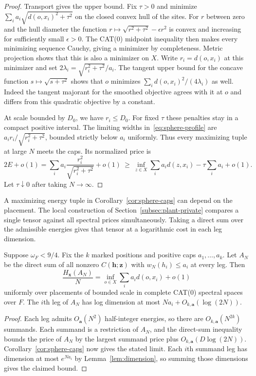 \begin{proof}
Transport gives the upper bound. Fix \(\tau>0\) and minimize
\(\sum_i a_i\sqrt{d(o,x_i)^2+\tau^2}\) on the closed convex hull of
the sites. For \(r\) between zero and the hull diameter the function \(r\mapsto\sqrt{r^2+\tau^2}-\epsilon r^2\) is
convex and increasing for sufficiently small \(\epsilon>0\). The CAT(0)
midpoint inequality then makes every minimizing sequence Cauchy, giving
a minimizer by completeness.
Metric projection shows that this is also a minimizer on \(X\).
Write \(r_i=d(o,x_i)\) at this minimizer and set
\(2\lambda_i=\sqrt{r_i^2+\tau^2}/a_i\). The tangent upper bound for the
concave function \(s\mapsto\sqrt{s+\tau^2}\) shows that \(o\) minimizes
\(\sum_i d(o,x_i)^2/(4\lambda_i)\) as well. Indeed the tangent
majorant for the smoothed objective agrees with it at \(o\) and differs
from this quadratic objective by a constant.

At scale bounded by \(D_0\), we have \(r_i\le D_0\). For fixed \(\tau\)
these penalties stay in a compact positive interval. The limiting
widths in~\eqref{eq:sphere-profile} are
\(a_i r_i/\sqrt{r_i^2+\tau^2}\), bounded strictly below \(a_i\) uniformly.
Thus every maximizing tuple at large \(N\) meets the caps. Its normalized
price is
\[
 2E+o(1)
 =\sum_i a_i\frac{r_i^2}{\sqrt{r_i^2+\tau^2}}+o(1)
 \ \ge\ \inf_{z\in X}\sum_i a_i d(z,x_i)-\tau\sum_i a_i+o(1).
\]
Let \(\tau\downarrow0\) after taking \(N\to\infty\).
\end{proof}

A maximizing energy tuple in Corollary~\ref{cor:sphere-caps} can depend
on the placement. The local construction of Section~\ref{subsec:plant-private}
compares a single tensor against all spectral prices simultaneously.
Taking a direct sum over the admissible energies gives that tensor at
a logarithmic cost in each leg dimension.

\begin{corollary}\label{cor:universal}
Suppose \(\omega_F<9/4\). Fix the \(k\) marked positions and positive
caps \(a_1,\ldots,a_k\). Let \(A_N\) be the direct sum of all nonzero
\(C(\mathbf h;\mathbf z)\) with \(w_N(h_i)\le a_i\) at every leg.
Then
\[
 \frac{H_{\mathbf x}(A_N)}{N}=\inf_{o\in X}\sum_i a_i d(o,x_i)+o(1)
\]
uniformly over placements of bounded scale in complete CAT(0)
spectral spaces over \(F\). The \(i\)th leg of \(A_N\) has log dimension
at most \(Na_i+O_{k,\mathbf a}(\log(2N))\).
\end{corollary}

\begin{proof}
Each leg admits \(O_{\mathbf a}(N^2)\) half-integer energies, so
there are \(O_{k,\mathbf a}(N^{2k})\) summands. Each summand is a
restriction of \(A_N\), and the direct-sum inequality bounds the price
of \(A_N\) by the largest summand price plus
\(O_{k,\mathbf a}(D\log(2N))\). Corollary~\ref{cor:sphere-caps} now
gives the stated limit. Each \(i\)th summand leg has dimension at most
\(e^{Na_i}\) by Lemma~\ref{lem:dimension}, so summing those dimensions
gives the claimed bound.
\end{proof}
